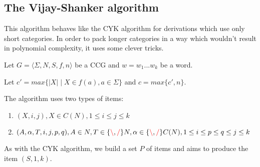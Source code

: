 \documentclass[12pt]{extarticle}
\theoremstyle{definition} \newtheorem{defn}{Definition}
\theoremstyle{definition} \newtheorem{prop}{Proposition}
\newcommand{\lc}{\textcolor{red}{\backslash}}
\newcommand{\rc}{\textcolor{red}{/}}
\begin{document}
\subsection{The Vijay-Shanker algorithm}

This algorithm behaves like the CYK algorithm for derivations which use only
short categories. In order to pack longer categories in a way which wouldn't
result in polynomial complexity, it uses some clever tricks.

Let $ G = \langle \Sigma, N, S, f, n \rangle $ be a CCG and $w = w_1 ... w_k$
be a word.

Let $c' = max \{ |X| \mid X \in f(a), a \in \Sigma \}$ and $c = max \{ c', n \}$.

The algorithm uses two types of items:
\begin{enumerate}
    \item $(X, i, j), X \in C(N), 1 \leq i \leq j \leq k$
    \item $(A, \alpha, T, i, j, p, q), A \in N, T \in \{ \lc, \rc \} N, \alpha \in \{ \lc, \rc \} C(N), 1 \leq i \leq p \leq q \leq j \leq k$
\end{enumerate}

As with the CYK algorithm, we build a set ${P}$ of items and aims to produce the item
$(S, 1, k)$.
\end{document}
